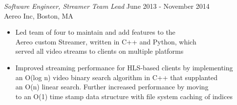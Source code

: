 \documentclass[line,margin]{res}
\begin{document}
\begin{resume}
            {\sl Software Engineer, Streamer Team Lead} \hfill June 2013 - November 2014 \\ %
            Aereo Inc, Boston, MA
                \begin{itemize} \itemsep -2pt %
                    \item Led team of four to maintain and add features to the \\
                          Aereo custom Streamer, written in C++ and Python, which \\
                          served all video streams to clients on multiple platforms
                    \item Improved streaming performance for HLS-based clients by implementing \\
                          an O(log n) video binary search algorithm in C++ that supplanted \\
                          an O(n) linear search. Further increased performance by moving \\
                          to an O(1) time stamp data structure with file system caching of indices
                \end{itemize}



\end{resume}
\end{document}
